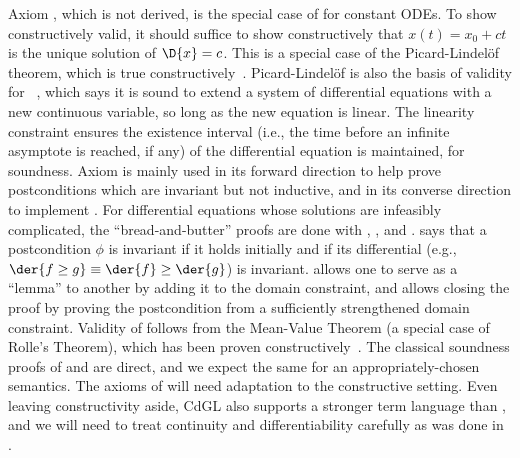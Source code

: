\documentclass[12pt]{cmuthesis}
\theoremstyle{definition}
\theoremstyle{remark}
\newcommand{\rref}[2][]{\prettyref{#2}}
\newcommand{\CdGL}{\textsf{CdGL}\xspace}
\begin{document}
Axiom , which is not derived, is the special case of  for constant ODEs.
To show  constructively valid, it should suffice to show constructively that $x(t) = x_0 + ct$ is the unique solution of $\D{x}=c$.
This is a special case of the Picard-Lindel\"{o}f theorem, which is true constructively~\cite{Krebbers+Spitters:lmcs:corn:2011,Krebbers+Spitters:lmcs:corn:2011}.
Picard-Lindel\"{o}f is also the basis of validity for ~\cite{DBLP:conf/lics/PlatzerT18}, which says it is sound to extend a system of differential equations with a new continuous variable, so long as the new equation is linear.
The linearity constraint ensures the existence interval (i.e., the time before an infinite asymptote is reached, if any) of the differential equation is maintained, for soundness.
Axiom  is mainly used in its forward direction to help prove postconditions which are invariant but not inductive, and in its converse direction to implement .
For differential equations whose solutions are infeasibly complicated, the ``bread-and-butter'' proofs are done with , , and .
 says that a postcondition $\phi$ is invariant if it holds initially and if its differential (e.g., $\der{f\geq g} \equiv \der{f} \geq \der{g}$) is invariant.
 allows one  to serve as a ``lemma'' to another by adding it to the domain constraint, and  allows closing the proof by proving the postcondition from a sufficiently strengthened domain constraint.
Validity of  follows from the Mean-Value Theorem (a special case of Rolle's Theorem), which has been proven constructively~\cite{Krebbers+Spitters:lmcs:corn:2011,Krebbers+Spitters:lmcs:corn:2011}.
The classical soundness proofs of  and  are direct, and we expect the same for an appropriately-chosen semantics.
The axioms of \rref{fig:diffeq-rules} will need adaptation to the constructive setting.
Even leaving constructivity aside, \CdGL also supports a stronger term language than \dGL, and we will need to treat continuity and differentiability carefully as was done in \rref{sec:definite-description}.
\end{document}
